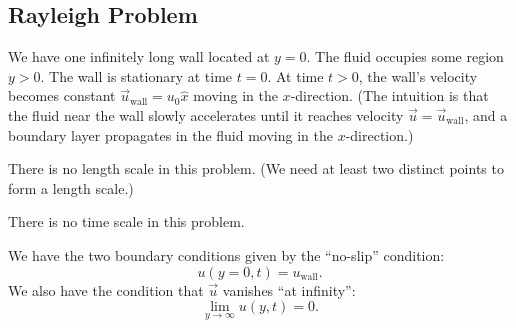 \subsection{Rayleigh Problem}

\begin{problem}
We have one infinitely long wall located at $y=0$. The fluid occupies
some region $y>0$. The wall is stationary at time $t=0$. At time
$t>0$, the wall's velocity becomes constant $\vec{u}_{\text{wall}}=u_{0}\widehat{x}$
moving in the $x$-direction. (The intuition is that the fluid near the
wall slowly accelerates until it reaches velocity
$\vec{u}=\vec{u}_{\text{wall}}$, and a boundary layer propagates in
the fluid moving in the $x$-direction.)
\end{problem}

\begin{node}
There is no length scale in this problem. (We need at least two
distinct points to form a length scale.)
\end{node}

\begin{node}
There is no time scale in this problem.
\end{node}

\begin{node}
We have the two boundary conditions given by the ``no-slip''
condition:
\begin{equation}
u(y=0,t)=u_{\text{wall}}.
\end{equation}
We also have the condition that $\vec{u}$ vanishes ``at infinity'':
\begin{equation}
\lim_{y\to\infty}u(y,t)=0.
\end{equation}
\end{node}

